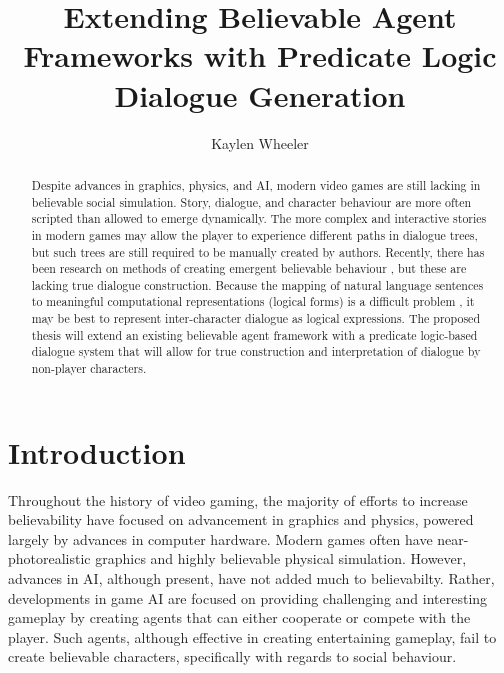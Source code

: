 \documentclass{article}
\begin{document}
\title{Extending Believable Agent Frameworks with Predicate
  Logic Dialogue Generation}
\author{Kaylen Wheeler}

\maketitle

\begin{abstract}

Despite advances in graphics, physics, and AI, modern video games are
still lacking in believable social simulation.  Story, dialogue, and
character behaviour are more often scripted than allowed to emerge
dynamically.  The more complex and interactive stories in modern games
may allow the player to experience different paths in dialogue trees,
but such trees are still required to be manually created by authors.
Recently, there has been research on methods of creating emergent
believable behaviour \cite{Acton2009,Mascarenhas,Mateasc}, but these are
lacking true dialogue construction.  Because the mapping of natural
language sentences to meaningful computational representations
(logical forms) is a difficult problem \cite{Zettlemoyer2004}, it
may be best to represent inter-character dialogue as logical expressions.
The proposed thesis will extend an existing believable agent
framework with a predicate logic-based dialogue system that will
allow for true construction and interpretation of dialogue by
non-player characters.

\end{abstract}

\section{Introduction}

Throughout the history of video gaming, the majority of efforts to
increase believability have focused on advancement in graphics and
physics, powered largely by advances in computer hardware.  Modern
games often have near-photorealistic graphics and highly believable
physical simulation.  However, advances in AI, although present, have
not added much to believabilty.  Rather, developments in game AI are
focused on providing challenging and interesting gameplay by creating
agents that can either cooperate or compete with the player.  Such
agents, although effective in creating entertaining gameplay, fail to
create believable characters, specifically with regards to social
behaviour.
\end{document}
